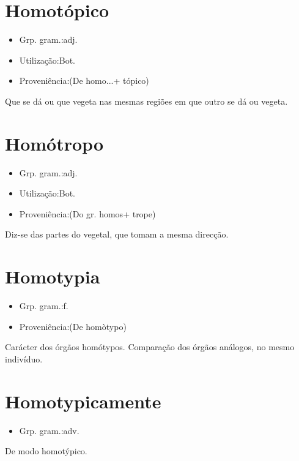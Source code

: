\documentclass{article}
\begin{document}
\section{Homotópico}
\begin{itemize}
\item {Grp. gram.:adj.}
\end{itemize}
\begin{itemize}
\item {Utilização:Bot.}
\end{itemize}
\begin{itemize}
\item {Proveniência:(De \textunderscore homo...\textunderscore  + \textunderscore tópico\textunderscore )}
\end{itemize}
Que se dá ou que vegeta nas mesmas regiões em que outro se dá ou vegeta.
\section{Homótropo}
\begin{itemize}
\item {Grp. gram.:adj.}
\end{itemize}
\begin{itemize}
\item {Utilização:Bot.}
\end{itemize}
\begin{itemize}
\item {Proveniência:(Do gr. \textunderscore homos\textunderscore  + \textunderscore trope\textunderscore )}
\end{itemize}
Diz-se das partes do vegetal, que tomam a mesma direcção.
\section{Homotypia}
\begin{itemize}
\item {Grp. gram.:f.}
\end{itemize}
\begin{itemize}
\item {Proveniência:(De \textunderscore homòtypo\textunderscore )}
\end{itemize}
Carácter dos órgãos homótypos.
Comparação dos órgãos análogos, no mesmo indivíduo.
\section{Homotypicamente}
\begin{itemize}
\item {Grp. gram.:adv.}
\end{itemize}
De modo homotýpico.
\end{document}
